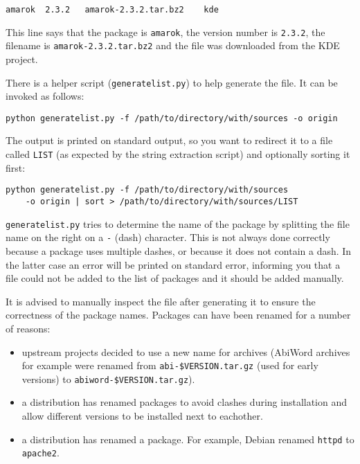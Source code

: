 \documentclass[10pt]{article}
\begin{document}
\begin{verbatim}
amarok	2.3.2	amarok-2.3.2.tar.bz2	kde
\end{verbatim}

This line says that the package is \texttt{amarok}, the version number is
\texttt{2.3.2}, the filename is \texttt{amarok-2.3.2.tar.bz2} and the file
was downloaded from the KDE project.

There is a helper script (\texttt{generatelist.py}) to help generate the file.
It can be invoked as follows:

\begin{verbatim}
python generatelist.py -f /path/to/directory/with/sources -o origin
\end{verbatim}

The output is printed on standard output, so you want to redirect it to a file
called \texttt{LIST} (as expected by the string extraction script) and
optionally sorting it first:

\begin{verbatim}
python generatelist.py -f /path/to/directory/with/sources
    -o origin | sort > /path/to/directory/with/sources/LIST
\end{verbatim}

\texttt{generatelist.py} tries to determine the name of the package by
splitting the file name on the right on a \texttt{-} (dash)
character. This is not always done correctly because a package uses multiple
dashes, or because it does not contain a dash. In the latter case an error
will be printed on standard error, informing you that a file could not be
added to the list of packages and it should be added manually.

It is advised to manually inspect the file after generating it to ensure the
correctness of the package names. Packages can have been renamed for a number
of reasons:

\begin{itemize}
\item upstream projects decided to use a new name for archives (AbiWord
archives for example were renamed from \texttt{abi-\$VERSION.tar.gz} (used for
early versions) to \texttt{abiword-\$VERSION.tar.gz}).
\item a distribution has renamed packages to avoid clashes during installation
and allow different versions to be installed next to eachother.
\item a distribution has renamed a package. For example, Debian renamed
\texttt{httpd} to \texttt{apache2}.
\end{itemize}
\end{document}
